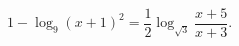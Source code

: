 \begin{ex}[type=equation]
	\begin{condition}
		$1 - \log_9 (x + 1)^2 = \dfrac{1}{2}\log_{\sqrt{3}} \dfrac{x + 5}{x + 3}.$
	\end{condition}
\end{ex}